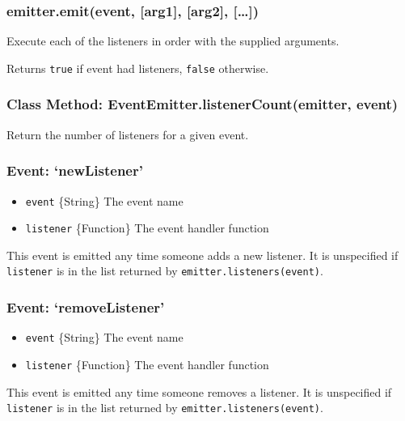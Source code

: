 \subsubsection{emitter.emit(event, {[}arg1{]}, {[}arg2{]},
{[}\ldots{}{]})}\label{emitter.emitevent-arg1-arg2}

Execute each of the listeners in order with the supplied arguments.

Returns \texttt{true} if event had listeners, \texttt{false} otherwise.

\subsubsection{Class Method: EventEmitter.listenerCount(emitter,
event)}\label{class-method-eventemitter.listenercountemitter-event}

Return the number of listeners for a given event.

\subsubsection{Event: `newListener'}\label{event-newlistener}

\begin{itemize}
\itemsep1pt\parskip0pt
\item
  \texttt{event} \{String\} The event name
\item
  \texttt{listener} \{Function\} The event handler function
\end{itemize}

This event is emitted any time someone adds a new listener. It is
unspecified if \texttt{listener} is in the list returned by
\texttt{emitter.listeners(event)}.

\subsubsection{Event: `removeListener'}\label{event-removelistener}

\begin{itemize}
\itemsep1pt\parskip0pt
\item
  \texttt{event} \{String\} The event name
\item
  \texttt{listener} \{Function\} The event handler function
\end{itemize}

This event is emitted any time someone removes a listener. It is
unspecified if \texttt{listener} is in the list returned by
\texttt{emitter.listeners(event)}.
